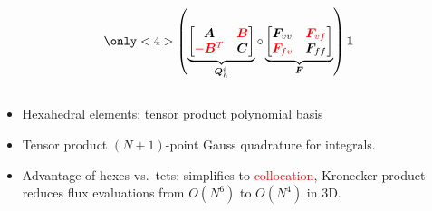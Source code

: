 \documentclass[compress]{beamer}
\theoremstyle{plain}
\newcommand{\LRp}[1]{\left( #1 \right)}
\renewcommand{\note}[1]{\textcolor{red}{{#1}}}
\begin{document}
{\begin{columns}
\begin{column}{.51\textwidth}
\[{}
\only<4>{
\LRp{\underbrace{\begin{bmatrix}
\bm{A} & \note{\bm{B}}\\
\note{-\bm{B}^T} & \bm{C}
\end{bmatrix}}_{\bm{Q}_h^i} \circ
\underbrace{\begin{bmatrix}
\bm{F}_{vv} & \note{\bm{F}_{vf}}\\
\note{\bm{F}_{fv}} & \bm{F}_{ff}
\end{bmatrix}}_{\bm{F}} } \bm{1}
}
\]
\end{column}
\end{columns}
\vspace{.5em}
\begin{itemize}
\item Hexahedral elements: tensor product polynomial basis
\vspace{.5em}
\item Tensor product $(N+1)$-point Gauss quadrature for integrals.
\vspace{.5em}
\item Advantage of hexes vs.\ tets: simplifies to \note{collocation}, Kronecker product reduces flux evaluations from $O(N^6)$ to $O(N^4)$ in 3D.
\vspace{.5em}
\end{itemize} 
}
\end{document}
